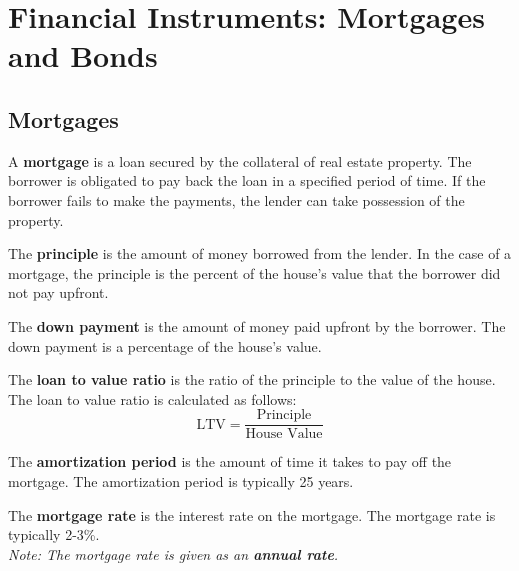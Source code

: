 \chapter{Financial Instruments: Mortgages and Bonds}

\section{Mortgages}

\begin{definition}
    A \textbf{mortgage} is a loan secured by the collateral of real estate property. The borrower is obligated to pay back the loan in a specified period of time. If the borrower fails to make the payments, the lender can take possession of the property.
\end{definition}

\begin{definition}
    [Principle]
    The \textbf{principle} is the amount of money borrowed from the lender. In the case of a mortgage, the principle is the percent of the house's value that the borrower did not pay upfront.
\end{definition}

\begin{definition}
    The \textbf{down payment} is the amount of money paid upfront by the borrower. The down payment is a percentage of the house's value.
\end{definition}

\begin{definition}
    The \textbf{loan to value ratio} is the ratio of the principle to the value of the house. The loan to value ratio is calculated as follows:
    \[
        \text{LTV} = \frac{\text{Principle}}{\text{House Value}}
    \]
\end{definition}

\begin{definition}
    The \textbf{amortization period} is the amount of time it takes to pay off the mortgage. The amortization period is typically 25 years.
\end{definition}

\begin{definition}
    The \textbf{mortgage rate} is the interest rate on the mortgage. The mortgage rate is typically 2-3\%.\\
    \textit{Note: The mortgage rate is given as an \textbf{annual rate}.}
\end{definition}

